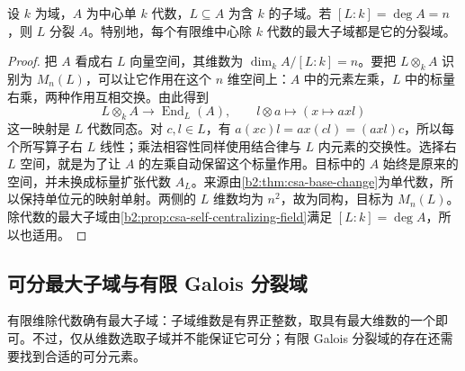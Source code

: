 \begin{proposition}\label{b2:prop:maximal-field-splits-csa}
	设 \(k\) 为域，\(A\) 为中心单 \(k\) 代数，\(L\subseteq A\) 为含 \(k\) 的子域。若 \([L:k]=\deg A=n\)，则 \(L\) 分裂 \(A\)。特别地，每个有限维中心除 \(k\) 代数的最大子域都是它的分裂域。
\end{proposition}
\begin{proof}
	把 \(A\) 看成右 \(L\) 向量空间，其维数为 \(\dim_kA/[L:k]=n\)。要把 \(L\otimes_kA\) 识别为 \(M_n(L)\)，可以让它作用在这个 \(n\) 维空间上：\(A\) 中的元素左乘，\(L\) 中的标量右乘，两种作用互相交换。由此得到
	\[
		L\otimes_kA\longrightarrow\operatorname{End}_L(A), \qquad l\otimes a\longmapsto(x\mapsto axl)
	\]
	这一映射是 \(L\) 代数同态。对 \(c,l\in L\)，有 \(a(xc)l=ax(cl)=(axl)c\)，所以每个所写算子右 \(L\) 线性；乘法相容性同样使用结合律与 \(L\) 内元素的交换性。选择右 \(L\) 空间，就是为了让 \(A\) 的左乘自动保留这个标量作用。目标中的 \(A\) 始终是原来的空间，并未换成标量扩张代数 \(A_L\)。来源由\cref{b2:thm:csa-base-change}为单代数，所以保持单位元的映射单射。两侧的 \(L\) 维数均为 \(n^2\)，故为同构，目标为 \(M_n(L)\)。除代数的最大子域由\cref{b2:prop:csa-self-centralizing-field}满足 \([L:k]=\deg A\)，所以也适用。
\end{proof}

\subsection{可分最大子域与有限 Galois 分裂域}
\label{b2:subsec:1702:04}

有限维除代数确有最大子域：子域维数是有界正整数，取具有最大维数的一个即可。不过，仅从维数选取子域并不能保证它可分；有限 Galois 分裂域的存在还需要找到合适的可分元素。

